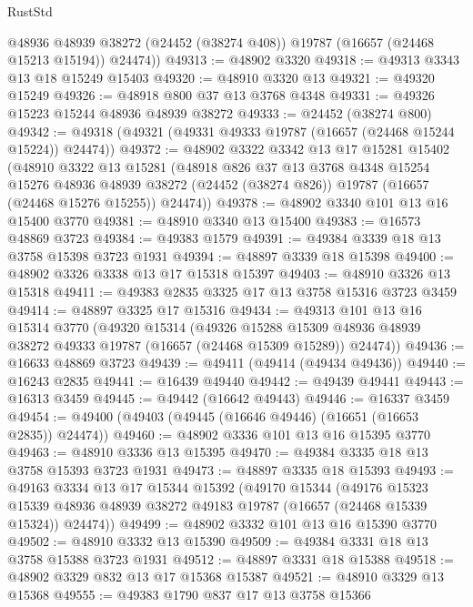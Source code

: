 \begin{lexlean}{RustStd}
\begin{coremodule}
        @48936
        @48939
        @38272
        (@24452 (@38274 @408))
        @19787
        (@16657 (@24468 @15213 @15194))
        @24474))
@49313 := @48902 @3320
@49318 := @49313 @3343 @13 @18 @15249 @15403
@49320 := @48910 @3320 @13
@49321 := @49320 @15249
@49326 := @48918 @800 @37 @13 @3768 @4348
@49331 := @49326 @15223 @15244 @48936 @48939 @38272
@49333 := @24452 (@38274 @800)
@49342 := @49318 (@49321 (@49331 @49333 @19787 (@16657 (@24468 @15244 @15224)) @24474))
@49372 := @48902
    @3322
    @3342
    @13
    @17
    @15281
    @15402
    (@48910
      @3322
      @13
      @15281
      (@48918
        @826
        @37
        @13
        @3768
        @4348
        @15254
        @15276
        @48936
        @48939
        @38272
        (@24452 (@38274 @826))
        @19787
        (@16657 (@24468 @15276 @15255))
        @24474))
@49378 := @48902 @3340 @101 @13 @16 @15400 @3770
@49381 := @48910 @3340 @13 @15400
@49383 := @16573 @48869 @3723
@49384 := @49383 @1579
@49391 := @49384 @3339 @18 @13 @3758 @15398 @3723 @1931
@49394 := @48897 @3339 @18 @15398
@49400 := @48902 @3326 @3338 @13 @17 @15318 @15397
@49403 := @48910 @3326 @13 @15318
@49411 := @49383 @2835 @3325 @17 @13 @3758 @15316 @3723 @3459
@49414 := @48897 @3325 @17 @15316
@49434 := @49313
    @101
    @13
    @16
    @15314
    @3770
    (@49320
      @15314
      (@49326
        @15288
        @15309
        @48936
        @48939
        @38272
        @49333
        @19787
        (@16657 (@24468 @15309 @15289))
        @24474))
@49436 := @16633 @48869 @3723
@49439 := @49411 (@49414 (@49434 @49436))
@49440 := @16243 @2835
@49441 := @16439 @49440
@49442 := @49439 @49441
@49443 := @16313 @3459
@49445 := @49442 (@16642 @49443)
@49446 := @16337 @3459
@49454 := @49400 (@49403 (@49445 (@16646 @49446) (@16651 (@16653 @2835)) @24474))
@49460 := @48902 @3336 @101 @13 @16 @15395 @3770
@49463 := @48910 @3336 @13 @15395
@49470 := @49384 @3335 @18 @13 @3758 @15393 @3723 @1931
@49473 := @48897 @3335 @18 @15393
@49493 := @49163
    @3334
    @13
    @17
    @15344
    @15392
    (@49170
      @15344
      (@49176
        @15323
        @15339
        @48936
        @48939
        @38272
        @49183
        @19787
        (@16657 (@24468 @15339 @15324))
        @24474))
@49499 := @48902 @3332 @101 @13 @16 @15390 @3770
@49502 := @48910 @3332 @13 @15390
@49509 := @49384 @3331 @18 @13 @3758 @15388 @3723 @1931
@49512 := @48897 @3331 @18 @15388
@49518 := @48902 @3329 @832 @13 @17 @15368 @15387
@49521 := @48910 @3329 @13 @15368
@49555 := @49383
    @1790
    @837
    @17
    @13
    @3758
    @15366

\end{coremodule}
\end{lexlean}
